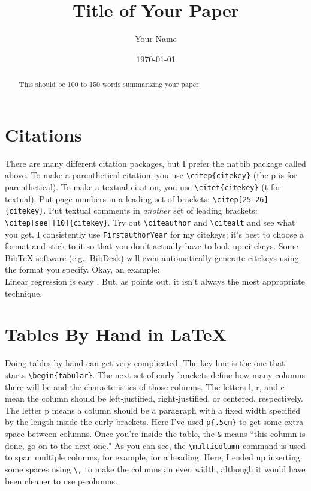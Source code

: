 \documentclass[12pt]{article}
\begin{document}



\title{Title of Your Paper}		%
\author{Your Name}			%
\date{\today}				%
\maketitle

\begin{abstract}
This should be 100 to 150 words summarizing your paper.
\end{abstract}

\newpage					%

\section{Citations}
There are many different citation packages, but I prefer the natbib package called above.  To make a parenthetical citation, you use \verb+\citep{citekey}+ (the p is for parenthetical).  To make a textual citation, you use \verb+\citet{citekey}+ (t for textual).  Put page numbers in a leading set of brackets: \verb+\citep[25-26]{citekey}+.  Put textual comments in \emph{another} set of leading brackets: \verb+\citep[see][10]{citekey}+.  Try out \verb+\citeauthor+ and \verb+\citealt+ and see what you get.  I consistently use \verb+FirstauthorYear+ for my citekeys; it's best to choose a format and stick to it so that you don't actually have to look up citekeys.  Some BibTeX software (e.g., BibDesk) will even automatically generate citekeys using the format you specify.  Okay, an example: \\

Linear regression is easy \citep[see, e.g.,][]{Gelman2007}.  But, as \citet[86-87]{Solt2001} points out, it isn't always the most appropriate technique.

\section{Tables By Hand in \LaTeX}
Doing tables by hand can get very complicated.  The key line is the one that starts \verb+\begin{tabular}+.  The next set of curly brackets define how many columns there will be and the characteristics of those columns.  The letters l, r, and c mean the column should be left-justified, right-justified, or centered, respectively.  The letter p means a column should be a paragraph with a fixed width specified by the length inside the curly brackets.  Here I've used \verb+p{.5cm}+ to get some extra space between columns.  Once you're inside the table, the \verb+&+ means ``this column is done, go on to the next one."  As you can see, the \verb+\multicolumn+ command is used to span multiple columns, for example, for a heading.  Here, I ended up inserting some spaces using \verb+\,+ to make the columns an even width, although it would have been cleaner to use p-columns.
\end{document}
